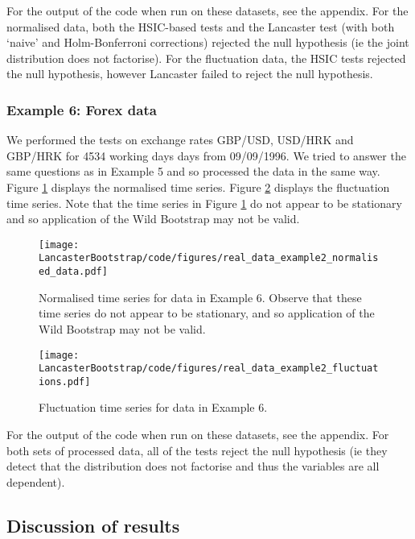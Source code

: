\documentclass[12pt]{article}
\numberwithin{claim}{section}
\numberwithin{lemma}{section}
\numberwithin{theorem}{section}
\begin{document}
For the output of the code when run on these datasets, see the appendix. For the normalised data, both the HSIC-based tests and the Lancaster test (with both `naive' and Holm-Bonferroni corrections) rejected the null hypothesis (ie the joint distribution does not factorise). For the fluctuation data, the HSIC tests rejected the null hypothesis, however Lancaster failed to reject the null hypothesis.


\subsubsection{Example 6: Forex data}

We performed the tests on exchange rates GBP/USD, USD/HRK and GBP/HRK for 4534 working days days from 09/09/1996. We tried to answer the same questions as in Example 5 and so processed the data in the same way. Figure \ref{fig:ex5_processed} displays the normalised time series. Figure \ref{fig:ex5_fluctuations} displays the fluctuation time series. Note that the time series in Figure \ref{fig:ex5_processed} do not appear to be stationary and so application of the Wild Bootstrap may not be valid.


\begin{figure}[htbp]
  \centering
  \texttt{[image: LancasterBootstrap/code/figures/real\_data\_example2\_normalised\_data.pdf]}
  \caption{Normalised time series for data in Example 6. Observe that these time series do not appear to be stationary, and so application of the Wild Bootstrap may not be valid.}
  \label{fig:ex5_processed}
\end{figure}

\begin{figure}[htbp]
  \centering
  \texttt{[image: LancasterBootstrap/code/figures/real\_data\_example2\_fluctuations.pdf]}
  \caption{Fluctuation time series for data in Example 6.}
  \label{fig:ex5_fluctuations}
\end{figure}

For the output of the code when run on these datasets, see the appendix. For both sets of processed data, all of the tests reject the null hypothesis (ie they detect that the distribution does not factorise and thus the variables are all dependent).


\subsection{Discussion of results}
\end{document}
